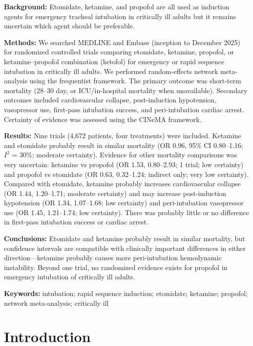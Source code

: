 \documentclass[11pt]{article}
\begin{document}
\textbf{Background:}
Etomidate, ketamine, and propofol are all used as induction agents for emergency tracheal intubation in critically ill adults but it remains uncertain which agent should be preferable.

\textbf{Methods:}
We searched MEDLINE and Embase (inception to December 2025) for randomized controlled trials comparing etomidate, ketamine, propofol, or ketamine--propofol combination (ketofol) for emergency or rapid sequence intubation in critically ill adults. We performed random-effects network meta-analysis using the frequentist framework. The primary outcome was short-term mortality (28--30 day, or ICU/in-hospital mortality when unavailable). Secondary outcomes included cardiovascular collapse, post-induction hypotension, vasopressor use, first-pass intubation success, and peri-intubation cardiac arrest. Certainty of evidence was assessed using the CINeMA framework.

\textbf{Results:}
Nine trials (4,672 patients, four treatments) were included. Ketamine and etomidate probably result in similar mortality (OR 0.96, 95\% CI 0.80--1.16; $I^2$ = 30\%; moderate certainty). Evidence for other mortality comparisons was very uncertain: ketamine vs propofol (OR 1.53, 0.80--2.93; 1 trial; low certainty) and propofol vs etomidate (OR 0.63, 0.32--1.24; indirect only; very low certainty). Compared with etomidate, ketamine probably increases cardiovascular collapse (OR 1.44, 1.20--1.71; moderate certainty) and may increase post-induction hypotension (OR 1.34, 1.07--1.68; low certainty) and peri-intubation vasopressor use (OR 1.45, 1.21--1.74; low certainty). There was probably little or no difference in first-pass intubation success or cardiac arrest.

\textbf{Conclusions:}
Etomidate and ketamine probably result in similar mortality, but confidence intervals are compatible with clinically important differences in either direction---ketamine probably causes more peri-intubation hemodynamic instability. Beyond one trial, no randomized evidence exists for propofol in emergency intubation of critically ill adults.

\textbf{Keywords:} intubation; rapid sequence induction; etomidate; ketamine; propofol; network meta-analysis; critically ill

\newpage

\section{Introduction}
\end{document}
